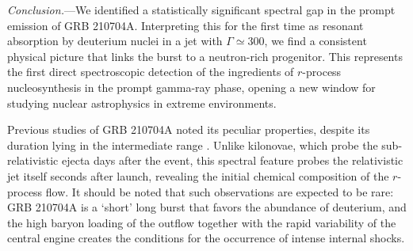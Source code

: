 \documentclass[prd,twocolumn,amsmath,amssymb,aps,linenumbers]{revtex4-2} %
\begin{document}
\textit{Conclusion.}---We identified a statistically significant spectral gap in the prompt emission of GRB 210704A. Interpreting this for the first time as resonant absorption by deuterium nuclei in a jet with $\Gamma\simeq 300$, we find a consistent physical picture that links the burst to a neutron-rich progenitor. This represents the first direct spectroscopic detection of the ingredients of $r$-process nucleosynthesis in the prompt gamma-ray phase, opening a new window for studying nuclear astrophysics in extreme environments.


Previous studies of GRB 210704A noted its peculiar properties, despite its duration lying in the intermediate range \citep{2021GCN.30380....1M, 2023MNRAS.522.5204B, 2026MNRAS.548ag555P}. %
Unlike kilonovae, which probe the sub-relativistic ejecta days after the event, this spectral feature probes the relativistic jet itself seconds after launch, revealing the initial chemical composition of the $r$-process flow. It should be noted that such observations are expected to be rare: GRB 210704A is a `short' long burst that favors the abundance of deuterium, and the high baryon loading of the outflow together with the rapid variability of the central engine creates the conditions for the occurrence of intense internal shocks.





\end{document}
